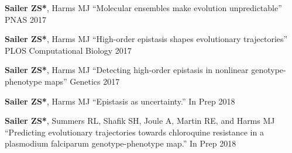 

\begin{cvpublications}

  \cvpublication
    {\textbf{Sailer ZS*}, Harms MJ} %
    {``Molecular ensembles make evolution unpredictable''} %
    {PNAS} %
    {2017} %

  \cvpublication
    {\textbf{Sailer ZS*}, Harms MJ} %
    {``High-order epistasis shapes evolutionary trajectories''} %
    {PLOS Computational Biology} %
    {2017} %

  \cvpublication
    {\textbf{Sailer ZS*}, Harms MJ} %
    {``Detecting high-order epistasis in nonlinear genotype-phenotype maps''} %
    {Genetics} %
    {2017} %

  \cvpublication
    {\textbf{Sailer ZS*}, Harms MJ} %
    {``Epistasis as uncertainty.''} %
    {In Prep} %
    {2018} %

  \cvpublication
    {\textbf{Sailer ZS*}, Summers RL, Shafik SH, Joule A, Martin RE, and Harms MJ} %
    {``Predicting evolutionary trajectories towards chloroquine resistance in a plasmodium falciparum genotype-phenotype map.''} %
    {In Prep} %
    {2018} %

\end{cvpublications}
